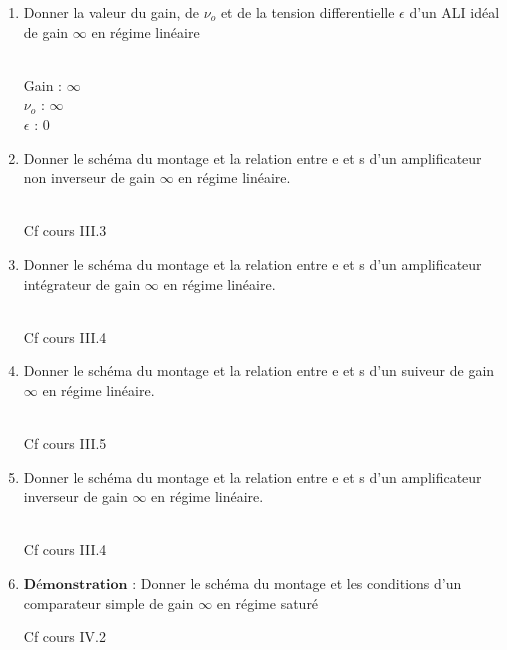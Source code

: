 \begin{enumerate}[label=\arabic{enumi} - , left=0pt, itemsep=1em]
\begin{solution}
    \end{solution}

    \item Donner la valeur du gain, de $\nu_o$ et de la tension differentielle $\epsilon$ d'un ALI idéal de gain $\infty$ en régime linéaire \par
    \begin{solution}\\
        Gain : $\infty$\\
        $\nu_o$ : $\infty$\\
        $\epsilon$ : 0

    \end{solution}

    \item Donner le schéma du montage et la relation entre e et s d'un amplificateur non inverseur de gain  $\infty$  en régime linéaire. \par
    \begin{solution}\\
        Cf cours III.3
    \end{solution}

    \item Donner le schéma du montage et la relation entre e et s d'un amplificateur intégrateur de gain  $\infty$  en régime linéaire. \par
    \begin{solution}\\
        Cf cours III.4
    \end{solution}

    \item Donner le schéma du montage et la relation entre e et s d'un suiveur de gain  $\infty$  en régime linéaire. \par
    \begin{solution}\\
        Cf cours III.5
    \end{solution}

    \item Donner le schéma du montage et la relation entre e et s d'un amplificateur inverseur de gain  $\infty$ en régime linéaire. \par
    \begin{solution}\\
        Cf cours III.4
    \end{solution}

    \item  $\textbf{Démonstration :}$ Donner le schéma du montage et les conditions d'un comparateur simple de gain  $\infty$ en régime saturé \par
    \begin{solution}
        Cf cours IV.2
    \end{solution}


\end{enumerate}
